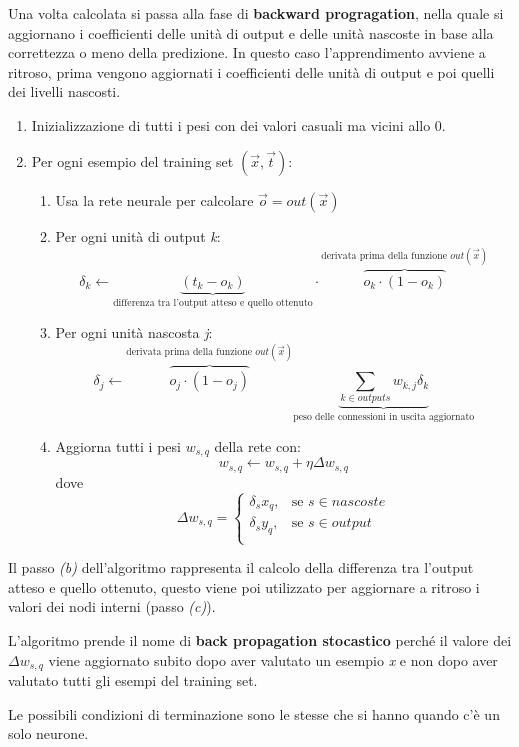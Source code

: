 Una volta calcolata si passa alla fase di
\textbf{backward progragation}, nella quale si aggiornano i coefficienti
delle unità di output e delle unità nascoste in base alla correttezza o
meno della predizione. In questo caso l'apprendimento avviene a ritroso,
prima vengono aggiornati i coefficienti delle unità di output e poi
quelli dei livelli nascosti.

\begin{enumerate}
\item Inizializzazione di tutti i pesi con dei valori casuali ma vicini allo 0.
\item Per ogni esempio del training set $(\vec{x},\vec{t})$:
	\begin{enumerate}
	\item Usa la rete neurale per calcolare $\vec{o} = out(\vec{x})$
	\item Per ogni unità di output \textit{k}: 
	$$\delta_k \leftarrow \underbrace{(t_k - o_k)}_{\text{differenza tra l'output atteso e quello ottenuto}} \cdot \overbrace{o_k \cdot (1 - o_k)}^{\text{derivata prima della funzione } out(\vec{x})}$$
	
	\item Per ogni unità nascosta \textit{j}: 
	$$\delta_j \leftarrow \overbrace{o_j \cdot (1 - o_j)}^{\text{derivata prima della funzione } out(\vec{x})} \underbrace{\sum_{k \in outputs} w_{k,j}\delta_k}_{\text{peso delle connessioni in uscita aggiornato}}$$
	
	\item Aggiorna tutti i pesi $w_{s,q}$ della rete con:
	$$ w_{s,q} \leftarrow w_{s,q} + \eta \Delta w_{s,q}$$
	dove
	$$
	\Delta w_{s,q} = 
		\begin{cases}
        	\delta_s x_q,& \text{se } s \in nascoste\\
    		\delta_s y_q,& \text{se } s \in output\\
		\end{cases}
	$$
	\end{enumerate}
\end{enumerate}

Il passo \textit{(b)} dell'algoritmo rappresenta il calcolo della differenza tra
l'output atteso e quello ottenuto, questo viene poi utilizzato per
aggiornare a ritroso i valori dei nodi interni (passo \textit{(c)}).

L'algoritmo prende il nome di \textbf{back propagation stocastico}
perché il valore dei $\Delta w_{s,q}$ viene aggiornato subito dopo aver
valutato un esempio \emph{x} e non dopo aver valutato tutti
gli esempi del training set.

Le possibili condizioni di terminazione sono le stesse che si hanno
quando c'è un solo neurone.

